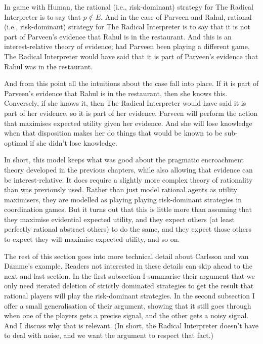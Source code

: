 \documentclass[11pt,]{book}
\begin{document}
In game with Human, the rational (i.e., risk-dominant) strategy for The Radical Interpreter is to say that \(p \notin E\). And in the case of Parveen and Rahul, rational (i.e., risk-dominant) strategy for The Radical Interpreter is to say that it is not part of Parveen's evidence that Rahul is in the restaurant. And this is an interest-relative theory of evidence; had Parveen been playing a different game, The Radical Interpreter would have said that it is part of Parveen's evidence that Rahul was in the restaurant.

And from this point all the intuitions about the case fall into place. If it is part of Parveen's evidence that Rahul is in the restaurant, then she knows this. Conversely, if she knows it, then The Radical Interpreter would have said it is part of her evidence, so it is part of her evidence. Parveen will perform the action that maximises expected utility given her evidence. And she will lose knowledge when that disposition makes her do things that would be known to be sub-optimal if she didn't lose knowledge.

In short, this model keeps what was good about the pragmatic encroachment theory developed in the previous chapters, while also allowing that evidence can be interest-relative. It does require a slightly more complex theory of rationality than was previously used. Rather than just model rational agents as utility maximisers, they are modelled as playing playing risk-dominant strategies in coordination games. But it turns out that this is little more than assuming that they maximise evidential expected utility, and they expect others (at least perfectly rational abstract others) to do the same, and they expect those others to expect they will maximise expected utility, and so on.

The rest of this section goes into more technical detail about Carlsson and van Damme's example. Readers not interested in these details can skip ahead to the next and last section. In the first subsection I summarise their argument that we only need iterated deletion of strictly dominated strategies to get the result that rational players will play the risk-dominant strategies. In the second subsection I offer a small generalisation of their argument, showing that it still goes through when one of the players gets a precise signal, and the other gets a noisy signal. And I discuss why that is relevant. (In short, the Radical Interpreter doesn't have to deal with noise, and we want the argument to respect that fact.)
\end{document}
